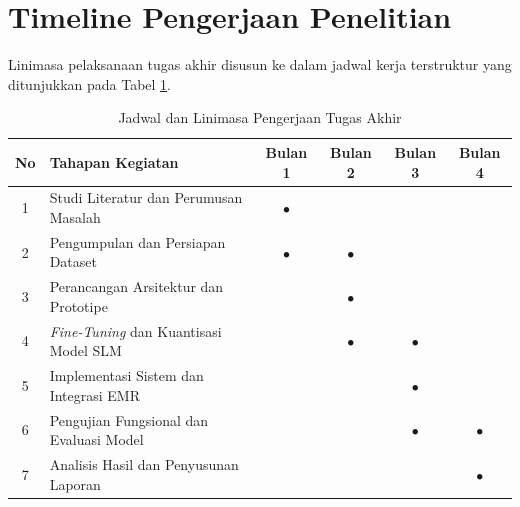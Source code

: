 \section{Timeline Pengerjaan Penelitian}
\label{sec:timeline}

Linimasa pelaksanaan tugas akhir disusun ke dalam jadwal kerja terstruktur yang ditunjukkan pada Tabel \ref{tab:timeline}.

\begin{table}[htbp]
  \centering
  \caption{Jadwal dan Linimasa Pengerjaan Tugas Akhir}
  \label{tab:timeline}
  \begin{tabularx}{\textwidth}{|c|X|c|c|c|c|}
    \hline
    \textbf{No} & \textbf{Tahapan Kegiatan} & \textbf{Bulan 1} & \textbf{Bulan 2} & \textbf{Bulan 3} & \textbf{Bulan 4} \\
    \hline
    1 & Studi Literatur dan Perumusan Masalah & $\bullet$ & & & \\
    \hline
    2 & Pengumpulan dan Persiapan Dataset & $\bullet$ & $\bullet$ & & \\
    \hline
    3 & Perancangan Arsitektur dan Prototipe & & $\bullet$ & & \\
    \hline
    4 & \emph{Fine-Tuning} dan Kuantisasi Model SLM & & $\bullet$ & $\bullet$ & \\
    \hline
    5 & Implementasi Sistem dan Integrasi EMR & & & $\bullet$ & \\
    \hline
    6 & Pengujian Fungsional dan Evaluasi Model & & & $\bullet$ & $\bullet$ \\
    \hline
    7 & Analisis Hasil dan Penyusunan Laporan & & & & $\bullet$ \\
    \hline
  \end{tabularx}
\end{table}
